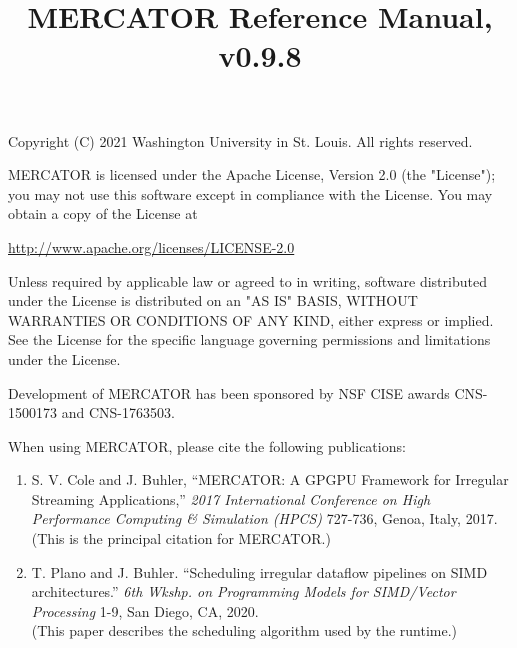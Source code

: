 \documentclass[11pt]{article}
\title{MERCATOR Reference Manual, v0.9.8}
\begin{document}
\maketitle

\noindent
Copyright (C) 2021 Washington University in St. Louis.  All rights
reserved.
\vspace{0.1in}

\noindent
MERCATOR is licensed under the Apache License, Version 2.0 (the
"License"); you may not use this software except in compliance with
the License.  You may obtain a copy of the License at

  \url{http://www.apache.org/licenses/LICENSE-2.0}
	
\noindent
Unless required by applicable law or agreed to in writing, software
distributed under the License is distributed on an "AS IS" BASIS,
WITHOUT WARRANTIES OR CONDITIONS OF ANY KIND, either express or implied.
See the License for the specific language governing permissions and
limitations under the License.
\vspace{0.1in}

\noindent
Development of MERCATOR has been sponsored by NSF CISE awards
CNS-1500173 and CNS-1763503.
\vspace{0.1in}

\noindent
When using MERCATOR, please cite the following publications:
\begin{enumerate}

\item
S. V. Cole and J. Buhler, ``MERCATOR: A GPGPU Framework for Irregular
Streaming Applications,'' \textit{2017 International Conference on
  High Performance Computing \& Simulation (HPCS)} 727-736, Genoa,
Italy, 2017.
\\
(This is the principal citation for MERCATOR.)

\item
T. Plano and J. Buhler. ``Scheduling irregular dataflow pipelines on
SIMD architectures.'' \textit{6th Wkshp. on Programming Models for SIMD/Vector
Processing} 1-9, San Diego, CA, 2020.
\\
(This paper describes the scheduling algorithm used by the runtime.)


\end{enumerate}
\end{document}
